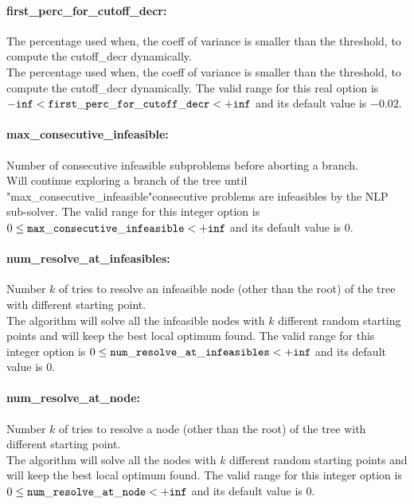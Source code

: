 \paragraph{first\_perc\_for\_cutoff\_decr:}\label{sec:first_perc_for_cutoff_decr} The percentage used when, the coeff of variance is smaller than the threshold, to compute the cutoff\_decr dynamically. $\;$ \\
 The percentage used when, the coeff of variance
is smaller than the threshold, to compute the
cutoff\_decr dynamically. The valid range for this real option is 
${\tt -inf} <  {\tt first\_perc\_for\_cutoff\_decr } <  {\tt +inf}$
and its default value is $-0.02$.


\paragraph{max\_consecutive\_infeasible:}\label{sec:max_consecutive_infeasible} Number of consecutive infeasible subproblems before aborting a branch. $\;$ \\
 Will continue exploring a branch of the tree
until "max\_consecutive\_infeasible"consecutive
problems are infeasibles by the NLP sub-solver. The valid range for this integer option is
$0 \le {\tt max\_consecutive\_infeasible } <  {\tt +inf}$
and its default value is $0$.


\paragraph{num\_resolve\_at\_infeasibles:}\label{sec:num_resolve_at_infeasibles} Number $k$ of tries to resolve an infeasible node (other than the root) of the tree with different starting point. $\;$ \\
 The algorithm will solve all the infeasible nodes
with $k$ different random starting points and
will keep the best local optimum found. The valid range for this integer option is
$0 \le {\tt num\_resolve\_at\_infeasibles } <  {\tt +inf}$
and its default value is $0$.


\paragraph{num\_resolve\_at\_node:}\label{sec:num_resolve_at_node} Number $k$ of tries to resolve a node (other than the root) of the tree with different starting point. $\;$ \\
 The algorithm will solve all the nodes with $k$
different random starting points and will keep
the best local optimum found. The valid range for this integer option is
$0 \le {\tt num\_resolve\_at\_node } <  {\tt +inf}$
and its default value is $0$.


